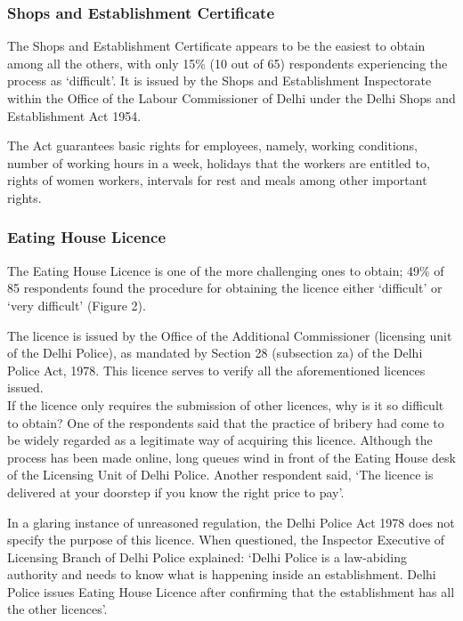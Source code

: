 \documentclass[a4paper, 12pt]{article}
\begin{document}
                   \subsubsection{Shops and Establishment Certificate}
                   The Shops and Establishment Certificate appears to be the easiest to obtain among all the others, with only 15\% (10 out of 65) respondents experiencing the process as ‘difficult’. It is issued by the Shops and Establishment Inspectorate within the Office of the Labour Commissioner of Delhi under the Delhi Shops and Establishment Act 1954.
                   
                   The Act guarantees basic rights for employees, namely, working conditions, number of working hours in a week, holidays that the workers are entitled to, rights of women workers, intervals for rest and meals among other important rights.
         
         
                   \subsubsection{Eating House Licence}
                   The Eating House Licence is one of the more challenging ones to obtain; 49\% of 85 respondents found the procedure for obtaining the licence either ‘difficult’ or ‘very difficult’ (Figure 2).
                   
                   The licence is issued by the Office of the Additional Commissioner (licensing unit of the Delhi Police), as mandated by Section 28 (subsection za) of the Delhi Police Act, 1978. This licence serves to verify all the aforementioned licences issued.\\
                   If the licence only requires the submission of other licences, why is it so difficult to obtain? One of the respondents said that the practice of bribery had come to be widely regarded as a legitimate way of acquiring this licence. Although the process has been made online, long queues wind in front of the Eating House desk of the Licensing Unit of Delhi Police. Another respondent said, ‘The licence is delivered at your doorstep if you know the right price to pay’.
                   
                   In a glaring instance of unreasoned regulation, the Delhi Police Act 1978 does not specify the purpose of this licence. When questioned, the Inspector Executive of Licensing Branch of Delhi Police explained: ‘Delhi Police is a law-abiding authority and needs to know what is happening inside an establishment. Delhi Police issues Eating House Licence after confirming that the establishment has all the other licences’.
                   
\end{document}
